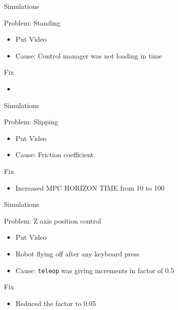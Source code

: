 \documentclass{beamer}
\begin{document}
\begin{frame}{Simulations}

\begin{block}{Problem: Standing}
    \begin{itemize}
        \item Put Video
        \item Cause: Control manager was not loading in time
    \end{itemize}
\end{block}

\begin{block}{Fix}
    \begin{itemize}
        \item 
    \end{itemize}
\end{block}

\end{frame}


\begin{frame}{Simulations}

\begin{block}{Problem: Slipping}
    \begin{itemize}
        \item Put Video
        \item Cause: Friction coefficient
    \end{itemize}
\end{block}

\begin{block}{Fix}
    \begin{itemize}
        \item Increased MPC HORIZON TIME from 10 to 100
    \end{itemize}
\end{block}

\end{frame}


\begin{frame}{Simulations}

\begin{block}{Problem: Z axis position control}
    \begin{itemize}
        \item Put Video
        \item Robot flying off after any keyboard press
        \item Cause: \texttt{teleop} was giving increments in factor of 0.5
    \end{itemize}
\end{block}

\begin{block}{Fix}
    \begin{itemize}
        \item Reduced the factor to 0.05
    \end{itemize}
\end{block}

\end{frame}
\end{document}

